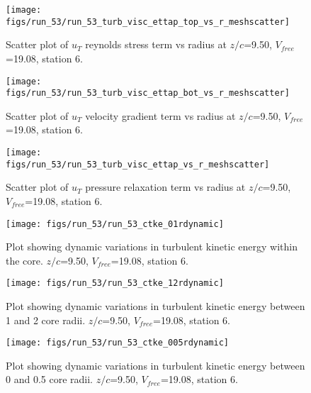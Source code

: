 \begin{figure}[H]
\centering
\texttt{[image: figs/run\_53/run\_53\_turb\_visc\_ettap\_top\_vs\_r\_meshscatter]}
\caption{Scatter plot of $
u_T$ reynolds stress term vs radius at $z/c$=9.50, $V_{free}$=19.08, station 6.}
\label{fig:run_53_turb_visc_ettap_top_vs_r_meshscatter}
\end{figure}


\begin{figure}[H]
\centering
\texttt{[image: figs/run\_53/run\_53\_turb\_visc\_ettap\_bot\_vs\_r\_meshscatter]}
\caption{Scatter plot of $
u_T$ velocity gradient term vs radius at $z/c$=9.50, $V_{free}$=19.08, station 6.}
\label{fig:run_53_turb_visc_ettap_bot_vs_r_meshscatter}
\end{figure}


\begin{figure}[H]
\centering
\texttt{[image: figs/run\_53/run\_53\_turb\_visc\_ettap\_vs\_r\_meshscatter]}
\caption{Scatter plot of $
u_T$ pressure relaxation term vs radius at $z/c$=9.50, $V_{free}$=19.08, station 6.}
\label{fig:run_53_turb_visc_ettap_vs_r_meshscatter}
\end{figure}


\begin{figure}[H]
\centering
\texttt{[image: figs/run\_53/run\_53\_ctke\_01rdynamic]}
\caption{Plot showing dynamic variations in turbulent kinetic energy within the core. $z/c$=9.50, $V_{free}$=19.08, station 6.}
\label{fig:run_53_ctke_01rdynamic}
\end{figure}


\begin{figure}[H]
\centering
\texttt{[image: figs/run\_53/run\_53\_ctke\_12rdynamic]}
\caption{Plot showing dynamic variations in turbulent kinetic energy between 1 and 2 core radii. $z/c$=9.50, $V_{free}$=19.08, station 6.}
\label{fig:run_53_ctke_12rdynamic}
\end{figure}


\begin{figure}[H]
\centering
\texttt{[image: figs/run\_53/run\_53\_ctke\_005rdynamic]}
\caption{Plot showing dynamic variations in turbulent kinetic energy between 0 and 0.5 core radii. $z/c$=9.50, $V_{free}$=19.08, station 6.}
\label{fig:run_53_ctke_005rdynamic}
\end{figure}


